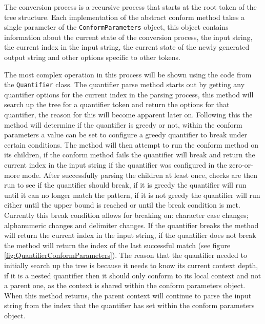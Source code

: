 The conversion process is a recursive process that starts at the root token of the tree structure. Each implementation of the abstract conform method takes a single parameter of the \texttt{ConformParameters} object, this object contains information about the current state of the conversion process, the input string, the current index in the input string, the current state of the newly generated output string and other options specific to other tokens.

The most complex operation in this process will be shown using the code from the \texttt{Quantifier} class. The quantifier parse method starts out by getting any quantifier options for the current index in the parsing process, this method will search up the tree for a quantifier token and return the options for that quantifier, the reason for this will become apparent later on. Following this the method will determine if the quantifier is greedy or not, within the conform parameters a value can be set to configure a greedy quantifier to break under certain conditions. The method will then attempt to run the conform method on its children, if the conform method fails the quantifier will break and return the current index in the input string if the quantifier was configured in the zero-or-more mode. After successfully parsing the children at least once, checks are then run to see if the quantifier should break, if it is greedy the quantifier will run until it can no longer match the pattern, if it is not greedy the quantifier will run either until the upper bound is reached or until the break condition is met. Currently this break condition allows for breaking on: character case changes; alphanumeric changes and delimiter changes. If the quantifier breaks the method will return the current index in the input string, if the quantifier does not break the method will return the index of the last successful match (see figure \ref{fig:QuantifierConformParameters}). The reason that the quantifier needed to initially search up the tree is because it needs to know its current context depth, if it is a nested quantifier then it should only conform to its local context and not a parent one, as the context is shared within the conform parameters object. When this method returns, the parent context will continue to parse the input string from the index that the quantifier has set within the conform parameters object.

